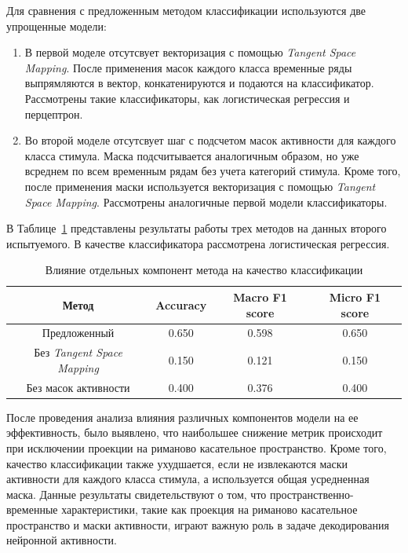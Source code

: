Для сравнения с предложенным методом классификации используются две упрощенные модели:
\begin{enumerate}
    \item В первой моделе отсутсвует векторизация с помощью \textit{Tangent Space Mapping}. После применения масок каждого класса временные ряды выпрямляются в вектор, конкатенируются и подаются на классификатор. Рассмотрены такие классификаторы, как логистическая регрессия и перцептрон.
    \item Во второй моделе отсутсвует шаг с подсчетом масок активности для каждого класса стимула. Маска подсчитывается аналогичным образом, но уже всреднем по всем временным рядам без учета категорий стимула. Кроме того, после применения маски используется векторизация с помощью \textit{Tangent Space Mapping}. Рассмотрены аналогичные первой модели классификаторы.
\end{enumerate}
В Таблице~\ref{comperison} представлены результаты работы трех методов на данных второго испытуемого. В качестве классификатора рассмотрена логистическая регрессия.
\begin{table}[h!]
	\centering
	\caption{Влияние отдельных компонент метода на качество классификации}
	\begin{tabular}{|c|c|c|c|}
		\hline
		Метод & Accuracy &  Macro F1 score & Micro F1 score\\
		\hline \hline
		Предложенный & 0.650 & 0.598 & 0.650\\ \hline  
           Без \textit{Tangent Space Mapping} & 0.150 & 0.121 & 0.150\\ \hline 
           Без масок активности & 0.400 & 0.376 & 0.400\\ \hline 
	\end{tabular}
	\label{comperison}
\end{table} 
После проведения анализа влияния различных компонентов модели на ее эффективность, было выявлено, что наибольшее снижение метрик происходит при исключении проекции на риманово касательное пространство. Кроме того, качество классификации также ухудшается, если не извлекаются маски активности для каждого класса стимула, а используется общая усредненная маска.
Данные результаты свидетельствуют о том, что пространственно-временные характеристики, такие как проекция на риманово касательное пространство и маски активности, играют важную роль в задаче декодирования нейронной активности. 